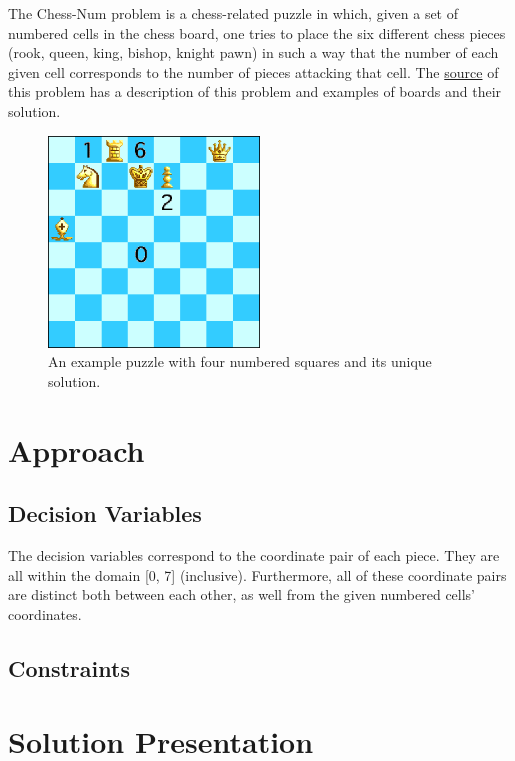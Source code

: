 \documentclass[runningheads]{llncs}
\begin{document}
The Chess-Num problem is a chess-related puzzle in which, given a set of
numbered cells in the chess board, one tries to place the six different chess
pieces (rook, queen, king, bishop, knight pawn) in such a way that the number
of each given cell corresponds to the number of pieces attacking that cell.
The \href{https://erich-friedman.github.io/puzzle/chessnum/}{source} of this
problem has a description of this problem and examples of boards and their solution.
\begin{figure}[H]
  \centering
  \includegraphics[width=0.5\textwidth]{figures/chessdemo.eps}
  \caption{An example puzzle with four numbered squares and its unique solution.}\label{fig:fig1}
\end{figure}

\section{Approach}
\subsection{Decision Variables}

The decision variables correspond to the coordinate pair of each piece. They are all
within the domain [0, 7] (inclusive). Furthermore, all of these coordinate pairs are
distinct both between each other, as well from the given numbered cells' coordinates.

\subsection{Constraints}

\section{Solution Presentation}
\end{document}
